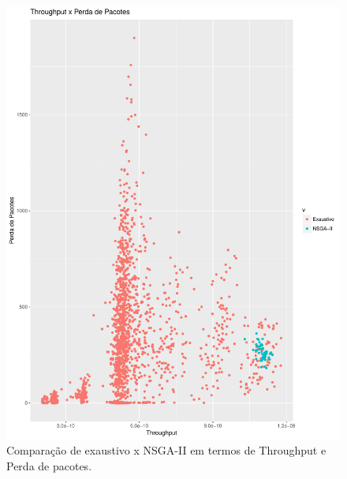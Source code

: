 \documentclass[conference]{IEEEtran}
\begin{document}
\begin{figure}[h]
  \centering
  \includegraphics[scale=0.30]{figures/ExaustivoXNsgaii_ThroughputXPerdaPacotes.pdf}
  \caption{Comparação de exaustivo x NSGA-II em termos de Throughput e Perda de pacotes.}
  \label{fig:exaustivo-nsgaii-2}
\end{figure}
\end{document}
